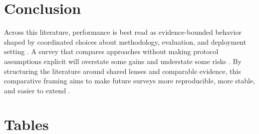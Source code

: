 \documentclass[a4paper,11pt]{article}
\begin{document}
\section{Conclusion}


Across this literature, performance is best read as evidence-bounded behavior shaped by coordinated choices about methodology, evaluation, and deployment setting \citep{Yao2026Authoritybench,An2026Fresco,Li2026Mrag,Guder2026Rage}. A survey that compares approaches without making protocol assumptions explicit will overstate some gains and understate some risks \citep{Brehme2025Retrieval,Packowski2024Optimizing,Muthyam2026Systems,Feng2026Rethinking}. By structuring the literature around shared lenses and comparable evidence, this comparative framing aims to make future surveys more reproducible, more stable, and easier to extend \citep{Su2025Dynamic,Bang2026Feedback,Cahoon2025Optimizing,Javadi2025Contradictions}.
\appendix

\section{Tables}
\end{document}
